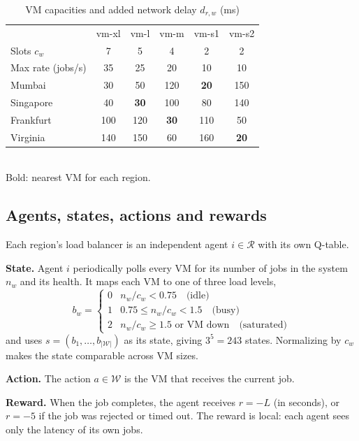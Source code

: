 \documentclass[conference]{IEEEtran}
\begin{document}
\begin{table}[t]
\caption{VM capacities and added network delay $d_{r,w}$ (ms)}
\label{tab:env}
\centering
\begin{tabular}{@{}lccccc@{}}
\toprule
 & vm-xl & vm-l & vm-m & vm-s1 & vm-s2 \\
Slots $c_w$ & 7 & 5 & 4 & 2 & 2 \\
Max rate (jobs/s) & 35 & 25 & 20 & 10 & 10 \\
\midrule
Mumbai    & 30  & 50  & 120 & \textbf{20} & 150 \\
Singapore & 40  & \textbf{30}  & 100 & 80  & 140 \\
Frankfurt & 100 & 120 & \textbf{30}  & 110 & 50  \\
Virginia  & 140 & 150 & 60  & 160 & \textbf{20} \\
\bottomrule
\end{tabular}
\\[2pt]{\footnotesize Bold: nearest VM for each region.}
\end{table}

\subsection{Agents, states, actions and rewards}
Each region's load balancer is an independent agent $i \in \mathcal{R}$ with its own Q-table.

\textbf{State.} Agent $i$ periodically polls every VM for its number of jobs in the system $n_w$ and its health. It maps each VM to one of three load levels,
\begin{equation}
b_w = \begin{cases}
0 & n_w / c_w < 0.75 \quad \text{(idle)}\\
1 & 0.75 \le n_w / c_w < 1.5 \quad \text{(busy)}\\
2 & n_w / c_w \ge 1.5 \text{ or VM down} \quad \text{(saturated)}
\end{cases}
\end{equation}
and uses $s = (b_1,\dots,b_{|\mathcal{W}|})$ as its state, giving $3^5 = 243$ states. Normalizing by $c_w$ makes the state comparable across VM sizes.

\textbf{Action.} The action $a \in \mathcal{W}$ is the VM that receives the current job.

\textbf{Reward.} When the job completes, the agent receives $r = -L$ (in seconds), or $r = -5$ if the job was rejected or timed out. The reward is local: each agent sees only the latency of its own jobs.
\end{document}
